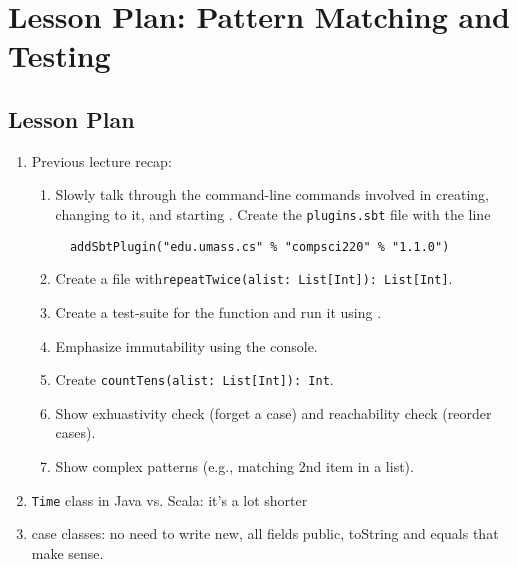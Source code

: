 \documentclass[9pt]{extbook}
\begin{document}
\chapter{Lesson Plan: Pattern Matching and Testing}

\lstset{language=scala}

\section*{Lesson Plan}

\begin{enumerate}

  \item Previous lecture recap:

\begin{enumerate}

  \item Slowly talk through the command-line commands involved in
  creating, changing to it, and starting \sbt{}. Create
  the \texttt{plugins.sbt} file with the line

  \begin{lstlisting}
  addSbtPlugin("edu.umass.cs" % "compsci220" % "1.1.0")
  \end{lstlisting}

  \item Create a file with\lstinline|repeatTwice(alist: List[Int]): List[Int]|.

  \item Create a test-suite for the function and run it using \sbt{}.

  \item Emphasize immutability using the console.

  \item Create \lstinline|countTens(alist: List[Int]): Int|.

  \item Show exhuastivity check (forget a case) and reachability check (reorder cases).

  \item Show complex patterns (e.g., matching 2nd item in a list).

\end{enumerate}

  \item \lstinline|Time| class in Java vs. Scala: it's a lot shorter

  \item case classes: no need to write new, all fields public, toString and equals that make sense.


\end{enumerate}
\end{document}
